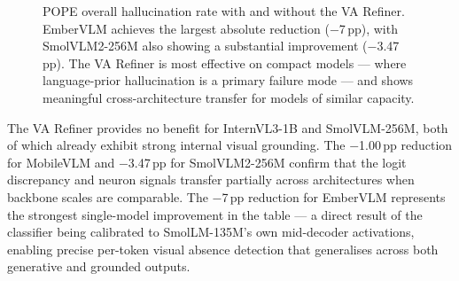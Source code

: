 \documentclass[runningheads]{llncs}
\begin{document}
\begin{figure}[ht]
\centering
{}
\caption{POPE overall hallucination rate with and without the VA Refiner.
EmberVLM achieves the largest absolute reduction ($-$7\,pp), with SmolVLM2-256M
also showing a substantial improvement ($-$3.47\,pp). The VA Refiner is most
effective on compact models — where language-prior hallucination is a primary
failure mode — and shows meaningful cross-architecture transfer for models of
similar capacity.}
\label{fig:pope-bar}
\end{figure}

The VA Refiner provides no benefit for InternVL3-1B and SmolVLM-256M, both of
which already exhibit strong internal visual grounding. The $-$1.00\,pp reduction
for MobileVLM and $-$3.47\,pp for SmolVLM2-256M confirm that the logit discrepancy
and neuron signals transfer partially across architectures when backbone scales are
comparable. The $-$7\,pp reduction for EmberVLM represents the strongest single-model
improvement in the table — a direct result of the classifier being calibrated to
SmolLM-135M's own mid-decoder activations, enabling precise per-token visual absence
detection that generalises across both generative and grounded outputs.

\end{document}

